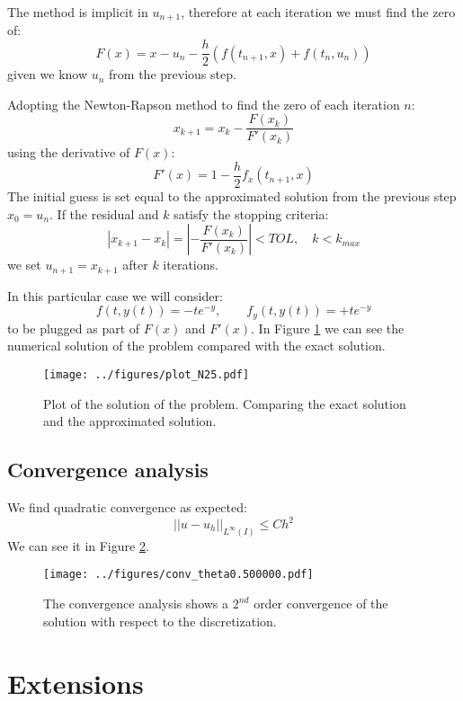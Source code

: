 \documentclass[]{article}
\begin{document}
The method is implicit in $u_{n+1}$, therefore at each iteration we must find the zero of:
\begin{equation}\label{eq::nonlin}
	F(x) = x - u_n - \frac{h}{2} \left( f(t_{n+1}, x) + f(t_{n},u_{n})  \right) 
\end{equation}
given we know $u_n$ from the previous step.

Adopting the Newton-Rapson method to find the zero of each iteration $n$:
$$x_{k+1} = x_{k} - \frac{F(x_k)}{F'(x_k)}$$
using the derivative of $F(x)$: 
\begin{equation}\label{eq::nonlinder}
	F'(x) = 1 - \frac{h}{2}  f_x(t_{n+1}, x)
\end{equation}
The initial guess is set equal to the approximated solution from the previous step $x_0 = u_n$. If the residual  and $k$ satisfy the stopping criteria:
$$|x_{k+1} - x_{k} | =\left|-  \frac{F(x_k)}{F'(x_k)} \right|  < TOL, \quad k<k_{max}$$
we set $u_{n+1} = x_{k+1}$ after $k$ iterations.

In this particular case we will consider:
$$f(t, y(t)) = -t e^{-y}, \qquad f_y (t, y(t)) = +t e^{-y} $$
to be plugged as part of $F(x)$ and $F'(x)$. In Figure \ref{fig::solution} we can see the numerical solution of the problem compared with the exact solution.

\begin{figure}[h!]
	\centering
	\texttt{[image: ../figures/plot\_N25.pdf]}
	\caption{Plot of the solution of the problem. Comparing the exact solution and the approximated solution.}
	\label{fig::solution}
\end{figure}

\newpage

\subsection{Convergence analysis}

We find quadratic convergence as expected:
$$| |  u - u_h ||_{L^\infty( I )} \leq Ch^2$$
We can see it in Figure \ref{fig::order2}.

\begin{figure}[t!]
	\centering
	\texttt{[image: ../figures/conv\_theta0.500000.pdf]}
	\caption{The convergence analysis shows a $2^{nd}$ order convergence of the solution with respect to the discretization.}
	\label{fig::order2}
\end{figure}


\section{Extensions}
\end{document}

